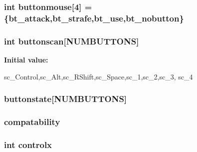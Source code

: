 \label{WL__PLAY_8C_a7d53efcab80b501943d05e6f82ca1b61}
\hypertarget{WL__PLAY_8C_aba18dce29b201b4aa0f95ac4b26a230d}{
\subsubsection[{buttonmouse}]{\setlength{\rightskip}{0pt plus 5cm}int {\bf buttonmouse}\mbox{[}4\mbox{]} = \{bt\_\-attack,bt\_\-strafe,bt\_\-use,bt\_\-nobutton\}}}
\label{WL__PLAY_8C_aba18dce29b201b4aa0f95ac4b26a230d}
\hypertarget{WL__PLAY_8C_a1f33f8928f170492601ca03d06dcaed5}{
\subsubsection[{buttonscan}]{\setlength{\rightskip}{0pt plus 5cm}int {\bf buttonscan}\mbox{[}NUMBUTTONS\mbox{]}}}
\label{WL__PLAY_8C_a1f33f8928f170492601ca03d06dcaed5}
{\bfseries Initial value:}
\begin{DoxyCode}

                        {sc_Control,sc_Alt,sc_RShift,sc_Space,sc_1,sc_2,sc_3,
      sc_4}
\end{DoxyCode}
\hypertarget{WL__PLAY_8C_a20a88de6f72f7a0d0ecae027aa6052d4}{
\subsubsection[{buttonstate}]{ {\bf buttonstate}\mbox{[}NUMBUTTONS\mbox{]}}}
\label{WL__PLAY_8C_a20a88de6f72f7a0d0ecae027aa6052d4}
\hypertarget{WL__PLAY_8C_ac82e52209129dcc9cad9d8c8d6b2a77a}{
\subsubsection[{compatability}]{ {\bf compatability}}}
\label{WL__PLAY_8C_ac82e52209129dcc9cad9d8c8d6b2a77a}
\hypertarget{WL__PLAY_8C_a6343ac6ef7aa896e23ee621de5be7389}{
\subsubsection[{controlx}]{\setlength{\rightskip}{0pt plus 5cm}int {\bf controlx}}}
